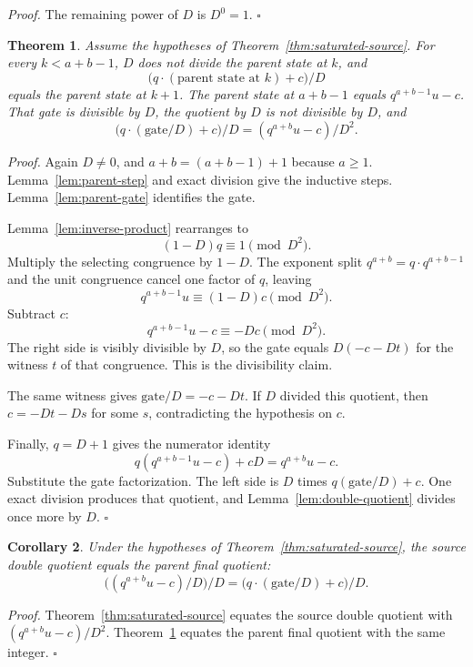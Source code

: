 \documentclass[11pt,letterpaper]{article}
\newtheorem{theorem}{Theorem}
\newtheorem{corollary}[theorem]{Corollary}
\newenvironment{proof}{\noindent\textit{Proof.}}{\hfill\(\square\)}
\begin{document}
\begin{proof}
The remaining power of \(D\) is \(D^0=1\).
\end{proof}

\begin{theorem}
\label{thm:saturated-parent}
Assume the hypotheses of Theorem~\ref{thm:saturated-source}. For every \(k<a+b-1\), \(D\) does not divide the parent state at \(k\), and
\[
\bigl(q\cdot(\text{parent state at \(k\)})+c\bigr)/D
\]
equals the parent state at \(k+1\). The parent state at \(a+b-1\) equals \(q^{a+b-1}u-c\). That gate is divisible by \(D\), the quotient by \(D\) is not divisible by \(D\), and
\[
\bigl(q\cdot(\text{gate}/D)+c\bigr)/D=(q^{a+b}u-c)/D^2.
\]
\end{theorem}

\begin{proof}
Again \(D\neq 0\), and \(a+b=(a+b-1)+1\) because \(a\ge 1\). Lemma~\ref{lem:parent-step} and exact division give the inductive steps. Lemma~\ref{lem:parent-gate} identifies the gate.

Lemma~\ref{lem:inverse-product} rearranges to
\[
(1-D)q\equiv 1\pmod{D^2}.
\]
Multiply the selecting congruence by \(1-D\). The exponent split \(q^{a+b}=q\cdot q^{a+b-1}\) and the unit congruence cancel one factor of \(q\), leaving
\[
q^{a+b-1}u\equiv (1-D)c\pmod{D^2}.
\]
Subtract \(c\):
\[
q^{a+b-1}u-c\equiv -Dc\pmod{D^2}.
\]
The right side is visibly divisible by \(D\), so the gate equals \(D(-c-Dt)\) for the witness \(t\) of that congruence. This is the divisibility claim.

The same witness gives \(\mathrm{gate}/D=-c-Dt\). If \(D\) divided this quotient, then \(c=-Dt-Ds\) for some \(s\), contradicting the hypothesis on \(c\).

Finally, \(q=D+1\) gives the numerator identity
\[
q(q^{a+b-1}u-c)+cD=q^{a+b}u-c.
\]
Substitute the gate factorization. The left side is \(D\) times \(q(\mathrm{gate}/D)+c\). One exact division produces that quotient, and Lemma~\ref{lem:double-quotient} divides once more by \(D\).
\end{proof}

\begin{corollary}
\label{cor:same-join}
Under the hypotheses of Theorem~\ref{thm:saturated-source}, the source double quotient equals the parent final quotient:
\[
\bigl((q^{a+b}u-c)/D\bigr)/D
=\bigl(q\cdot(\mathrm{gate}/D)+c\bigr)/D.
\]
\end{corollary}

\begin{proof}
Theorem~\ref{thm:saturated-source} equates the source double quotient with \((q^{a+b}u-c)/D^2\). Theorem~\ref{thm:saturated-parent} equates the parent final quotient with the same integer.
\end{proof}
\end{document}
